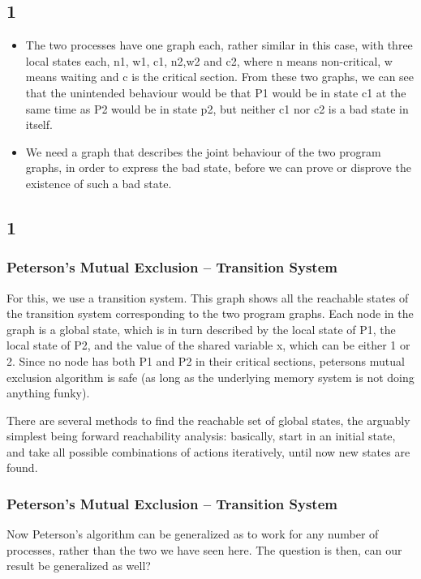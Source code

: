 \documentclass[handout]{beamer}
\begin{document}
\begin{footnotesize}
\subsection*{1}
\begin{frame}
\begin{itemize}
\item
The two processes have one graph each, rather similar in this case, with three local states each, n1, w1, c1, n2,w2 and c2, where n means non-critical, w means waiting and c is the critical section. From these two graphs, we can see that the unintended behaviour would be that P1 would be in state c1 at the same time as P2 would be in state p2, but neither c1 nor c2 is a bad state in itself.
\item
We need a graph that describes the joint behaviour of the two program graphs, in order to express the bad state, before we can prove or disprove the existence of such a bad state.

\end{itemize}
\end{frame}

\subsection*{1}
\begin{frame}
  \frametitle{Peterson's Mutual Exclusion -- Transition System}
For this, we use a transition system. This graph shows all the reachable states of the transition system corresponding to the two program graphs. Each node in the graph is a global state, which is in turn described by the local state of P1, the local state of P2, and the value of the shared variable x, which can be either 1 or 2. Since no node has both P1 and P2 in their critical sections, petersons mutual exclusion algorithm is safe (as long as the underlying memory system is not doing anything funky).

There are several methods to find the reachable set of global states, the arguably simplest being forward reachability analysis: basically, start in an initial state, and take all possible combinations of actions iteratively, until now new states are found.
\end{frame}

\begin{frame}
  \frametitle{Peterson's Mutual Exclusion -- Transition System}
Now Peterson's algorithm can be generalized as to work for any number of processes, rather than the two we have seen here. The question is then, can our result be generalized as well?


\end{frame}
\end{footnotesize}
\end{document}
